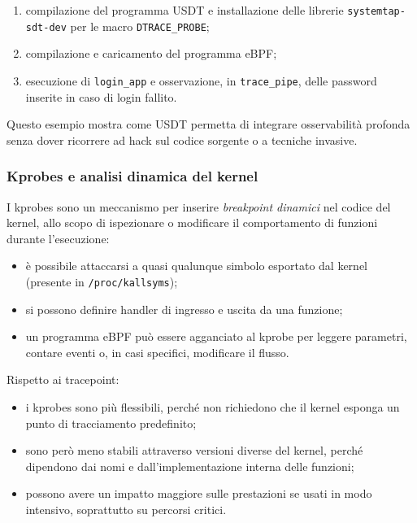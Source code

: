 \begin{enumerate}
  \item compilazione del programma USDT e installazione delle librerie
        \texttt{systemtap-sdt-dev} per le macro \texttt{DTRACE\_PROBE};
  \item compilazione e caricamento del programma eBPF;
  \item esecuzione di \texttt{login\_app} e osservazione, in \texttt{trace\_pipe},
        delle password inserite in caso di login fallito.
\end{enumerate}

Questo esempio mostra come USDT permetta di integrare osservabilità profonda
senza dover ricorrere ad hack sul codice sorgente o a tecniche invasive.

\subsubsection{Kprobes e analisi dinamica del kernel}

I kprobes sono un meccanismo per inserire \emph{breakpoint dinamici} nel codice
del kernel, allo scopo di ispezionare o modificare il comportamento di funzioni
durante l’esecuzione:

\begin{itemize}
  \item è possibile attaccarsi a quasi qualunque simbolo esportato dal kernel
        (presente in \texttt{/proc/kallsyms});
  \item si possono definire handler di ingresso e uscita da una funzione;
  \item un programma eBPF può essere agganciato al kprobe per leggere
        parametri, contare eventi o, in casi specifici, modificare il flusso.
\end{itemize}

Rispetto ai tracepoint:

\begin{itemize}
  \item i kprobes sono più flessibili, perché non richiedono che il kernel
        esponga un punto di tracciamento predefinito;
  \item sono però meno stabili attraverso versioni diverse del kernel, perché
        dipendono dai nomi e dall’implementazione interna delle funzioni;
  \item possono avere un impatto maggiore sulle prestazioni se usati in modo
        intensivo, soprattutto su percorsi critici.
\end{itemize}

